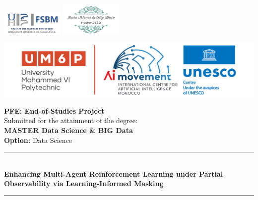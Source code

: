 \begin{titlepage}
    \centering

    
\begin{minipage}{0.4\textwidth}
    \begin{flushleft}
        \includegraphics[width=3cm]{fsbm-removebg.png}
        \hspace*{-0.2cm} %
        \includegraphics[width=3cm]{images_pfe/dsbd.png}
    \end{flushleft}
\end{minipage}\hfill
\begin{minipage}{0.5\textwidth}
    \begin{flushright}
        \includegraphics{images_pfe/AIM-UNESCO_EN.png}
    \end{flushright}
\end{minipage}

    \vspace{1cm} %

   {\large \bfseries PFE: End-of-Studies Project }\\[5mm]
    {\large Submitted for the attainment of the degree:}\\[5mm]
    {\large \bfseries MASTER Data Science \& BIG Data}\\[5mm]
    \textbf{Option:} {\large Data Science}

    \vspace{0.5cm} %

    \rule{\linewidth}{0.3mm} \\[0.4cm]
    { \huge \bfseries Enhancing Multi-Agent Reinforcement Learning under
    Partial Observability via Learning-Informed Masking\\[0.2cm] }
    \rule{\linewidth}{0.3mm}


\end{titlepage}
